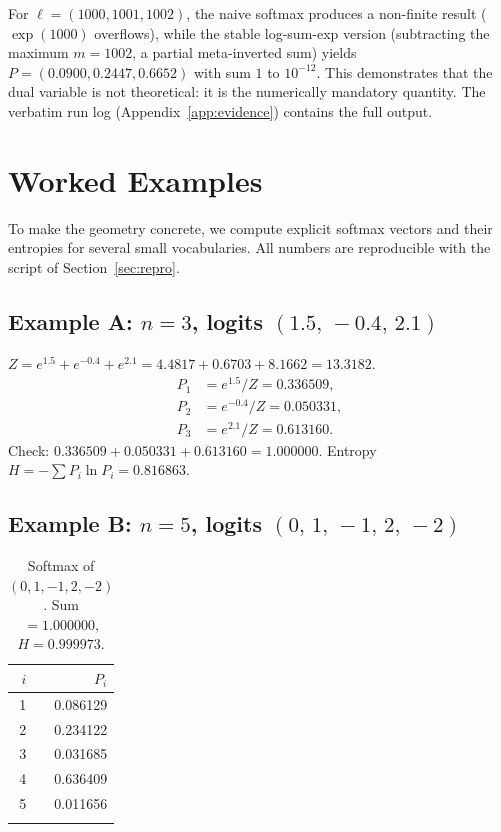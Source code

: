 \documentclass[11pt]{article}
\begin{document}
For $\ell=(1000,1001,1002)$, the naive softmax produces a non-finite result
($\exp(1000)$ overflows), while the stable log-sum-exp version (subtracting the
maximum $m=1002$, a partial meta-inverted sum) yields
$P=(0.0900,0.2447,0.6652)$ with sum $1$ to $10^{-12}$. This demonstrates that
the dual variable is not theoretical: it is the numerically mandatory quantity.
The verbatim run log (Appendix~\ref{app:evidence}) contains the full output.

\section{Worked Examples}
\label{sec:worked}

To make the geometry concrete, we compute explicit softmax vectors and their
entropies for several small vocabularies. All numbers are reproducible with the
script of Section~\ref{sec:repro}.

\subsection{Example A: $n=3$, logits $(1.5,\,-0.4,\,2.1)$}
\label{sec:worked-a}

$Z = e^{1.5}+e^{-0.4}+e^{2.1} = 4.4817 + 0.6703 + 8.1662 = 13.3182$.
\begin{align*}
P_1 &= e^{1.5}/Z   = 0.336509,\\
P_2 &= e^{-0.4}/Z   = 0.050331,\\
P_3 &= e^{2.1}/Z    = 0.613160.
\end{align*}
Check: $0.336509+0.050331+0.613160 = 1.000000$. Entropy
$H = -\sum P_i\ln P_i = 0.816863$.

\subsection{Example B: $n=5$, logits $(0,\,1,\,-1,\,2,\,-2)$}
\label{sec:worked-b}

\begin{longtable}{@{}rr@{}}
\toprule
$i$ & $P_i$ \\
\midrule
1 & 0.086129 \\
2 & 0.234122 \\
3 & 0.031685 \\
4 & 0.636409 \\
5 & 0.011656 \\
\bottomrule
\caption{Softmax of $(0,1,-1,2,-2)$. Sum $=1.000000$, $H=0.999973$.}
\label{tab:worked-b}
\end{longtable}
\end{document}
